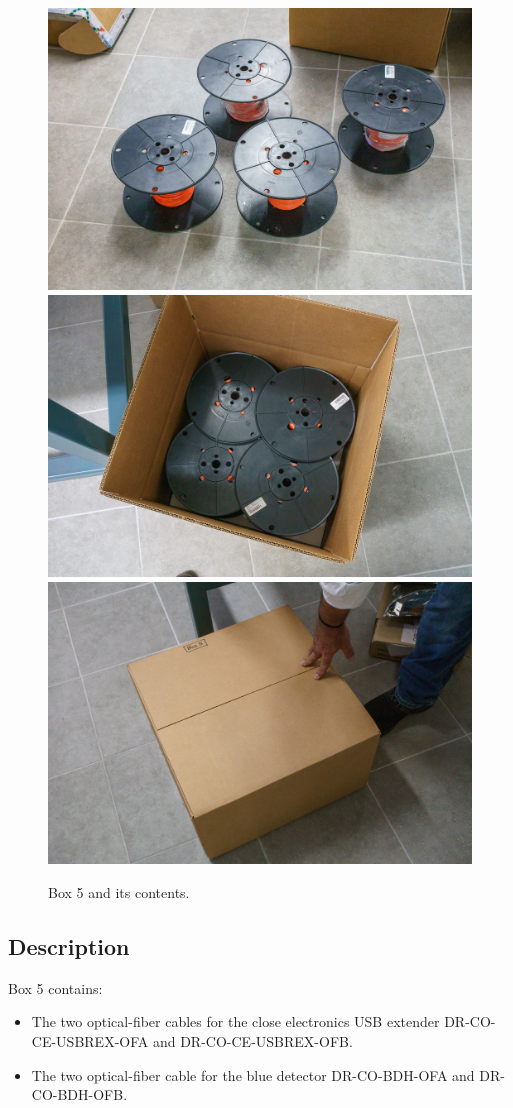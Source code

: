 \documentclass{article}
\begin{document}
\begin{figure}
\begin{center}
\includegraphics[width=0.60\linewidth]{figures/20201207T184739.jpg}\\[\smallskipamount]
\includegraphics[width=0.60\linewidth]{figures/20201207T184823.jpg}\\[\smallskipamount]
\includegraphics[width=0.60\linewidth]{figures/20201207T185114.jpg}
\end{center}
\caption{Box 5 and its contents.}
\label{figure:box-five}
\end{figure}

\subsection{Description}

Box 5 contains:

\begin{itemize}
    \item The two optical-fiber cables for the close electronics USB extender DR-CO-CE-USBREX-OFA and DR-CO-CE-USBREX-OFB.
\item The two optical-fiber cable for the blue detector DR-CO-BDH-OFA and DR-CO-BDH-OFB.
\end{itemize}
\end{document}
